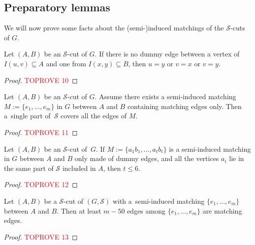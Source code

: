 \documentclass[a4paper,UKenglish,cleveref,hyperref,autoref]{lipics-v2021}
\begin{document}
\subsection{Preparatory lemmas}

\renewcommand{\part}{\text{part}}

We will now prove some facts about the (semi-)induced matchings of the $\mathcal S$-cuts of $G$.

\begin{lemma}\label{lem:no-dummy-edge-S-cut}
	Let $(A, B)$ be an $\mathcal S$-cut of $G$.
	If there is no dummy edge between a vertex of $I(u,v)\subseteq A$ and one from $I(x,y)\subseteq B$, then $u=y$ or $v=x$ or $v=y$.
\end{lemma}
\begin{proof}\textcolor{red}{TOPROVE 10}\end{proof}

\begin{lemma}\label{lem:matching-edges-are-clean}
  Let $(A, B)$ be an $\mathcal S$-cut of $G$.
  Assume there exists a semi-induced matching $M := \{e_1, \dots, e_m\}$ in $G$ between $A$ and $B$ containing matching edges only.
  Then a~single part of~$\mathcal S$ covers all the edges of $M$. 
\end{lemma}
\begin{proof}\textcolor{red}{TOPROVE 11}\end{proof}

\begin{lemma}\label{lem:white-edges-restriction}
  Let $(A, B)$ be an $\mathcal S$-cut of~$G$.
  If $M := \{a_1b_1, \dots, a_tb_t\}$ is a semi-induced matching in $G$ between $A$ and $B$ only made of dummy edges, and all the vertices $a_i$ lie in the same part of $\mathcal S$ included in $A$, then $t \leqslant 6$.
\end{lemma}
\begin{proof}\textcolor{red}{TOPROVE 12}\end{proof}

\begin{lemma}\label{lem:mim-width-local}
  Let $(A, B)$ be a $\mathcal S$-cut of $(G, \mathcal S)$ with a~semi-induced matching $\{e_1, \ldots, e_m\}$ between $A$ and $B$.
  Then at least $m - 50$ edges among $\{e_1, \ldots, e_m\}$ are matching edges.
\end{lemma}
\begin{proof}\textcolor{red}{TOPROVE 13}\end{proof}
\end{document}
